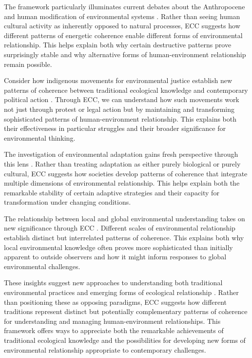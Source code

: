 \begin{refsection}
The framework particularly illuminates current debates about the Anthropocene and human modification of environmental systems \cite{haraway2016staying}. Rather than seeing human cultural activity as inherently opposed to natural processes, ECC suggests how different patterns of energetic coherence enable different forms of environmental relationship. This helps explain both why certain destructive patterns prove surprisingly stable and why alternative forms of human-environment relationship remain possible.

Consider how indigenous movements for environmental justice establish new patterns of coherence between traditional ecological knowledge and contemporary political action \cite{nadasdy2007gift}. Through ECC, we can understand how such movements work not just through protest or legal action but by maintaining and transforming sophisticated patterns of human-environment relationship. This explains both their effectiveness in particular struggles and their broader significance for environmental thinking.

The investigation of environmental adaptation gains fresh perspective through this lens \cite{strathern1980no}. Rather than treating adaptation as either purely biological or purely cultural, ECC suggests how societies develop patterns of coherence that integrate multiple dimensions of environmental relationship. This helps explain both the remarkable stability of certain adaptive strategies and their capacity for transformation under changing conditions.

The relationship between local and global environmental understanding takes on new significance through ECC \cite{tsing2015mushroom}. Different scales of environmental relationship establish distinct but interrelated patterns of coherence. This explains both why local environmental knowledge often proves more sophisticated than initially apparent to outside observers and how it might inform responses to global environmental challenges.

These insights suggest new approaches to understanding both traditional environmental practices and emerging forms of ecological relationship \cite{latour2004politics}. Rather than positioning these as opposing paradigms, ECC suggests how different traditions represent distinct but potentially complementary patterns of coherence for understanding and managing human-environment relationships. This framework offers ways to appreciate both the remarkable achievements of traditional ecological knowledge and the possibilities for developing new forms of environmental relationship appropriate to contemporary challenges.


\end{refsection}
